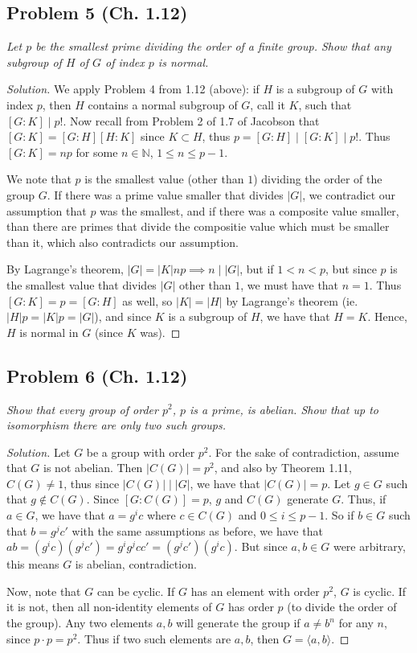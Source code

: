 \documentclass{article}
\newcommand{\N}{{\mathbb N}}
\begin{document}
\subsection*{Problem 5 (Ch. 1.12)}
{\it Let $p$ be the smallest prime dividing the order of a finite group.
Show that any subgroup of $H$ of $G$ of index $p$ is normal.}
\begin{proof}[Solution]\let\qed\relax
	We apply Problem 4 from 1.12 (above):
	if $H$ is a subgroup of $G$ with index $p$,
	then $H$ contains a normal subgroup of $G$, call it $K$,
	such that $[G:K] \mid p!$.
	Now recall from Problem 2 of 1.7 of Jacobson
	that $[G:K] = [G:H][H:K]$ since $K \subset H$,
	thus $p = [G:H] \mid [G:K] \mid p!$.
	Thus $[G:K] = np$ for some $n \in \N$, $1 \leq n \leq p-1$.

	We note that $p$ is the smallest value (other than $1$)
	dividing the order of the group $G$.
	If there was a prime value smaller that divides $|G|$,
	we contradict our assumption that $p$ was the smallest,
	and if there was a composite value smaller,
	than there are primes that divide the compositie value
	which must be smaller than it, which also contradicts our assumption.
	
	By Lagrange's theorem, $|G| = |K|np \implies n \mid |G|$,
	but if $1 < n < p$,
	but since $p$ is the smallest value that divides $|G|$ other than $1$,
	we must have that $n = 1$.
	Thus $[G:K] = p = [G:H]$ as well,
	so $|K| = |H|$ by Lagrange's theorem (ie. $|H|p = |K|p = |G|$),
	and since $K$ is a subgroup of $H$,
	we have that $H = K$.
	Hence, $H$ is normal in $G$ (since $K$ was).
\end{proof}


\subsection*{Problem 6 (Ch. 1.12)}
{\it Show that every group of order $p^2$, $p$ is a prime, is abelian.
Show that up to isomorphism there are only two such groups.}
\begin{proof}[Solution]\let\qed\relax
	Let $G$ be a group with order $p^2$.
	For the sake of contradiction,
	assume that $G$ is not abelian.
	Then $|C(G)| = p^2$,
	and also by Theorem 1.11,
	$C(G) \neq 1$,
	thus since $|C(G)| \mid |G|$, we have that $|C(G)| = p$.
	Let $g \in G$ such that $g \not \in C(G)$.
	Since $[G:C(G)] = p$, $g$ and $C(G)$ generate $G$.
	Thus, if $a \in G$,
	we have that $a = g^ic$ where $c \in C(G)$ and $0 \leq i \leq p-1$.
	So if $b \in G$ such that $b = g^jc'$ with the same assumptions as before,
	we have that $ab = (g^ic)(g^jc') = g^ig^jcc' = (g^jc')(g^ic)$.
	But since $a,b \in G$ were arbitrary,
	this means $G$ is abelian, contradiction.

	Now, note that $G$ can be cyclic.
	If $G$ has an element with order $p^2$, $G$ is cyclic.
	If it is not, then all non-identity elements of $G$ has order $p$
	(to divide the order of the group).
	Any two elements $a,b$ will generate the group
	if $a \neq b^n$ for any $n$, since $p\cdot p = p^2$.
	Thus if two such elements are $a,b$, then $G = \langle a,b \rangle$.
\end{proof}
\end{document}
